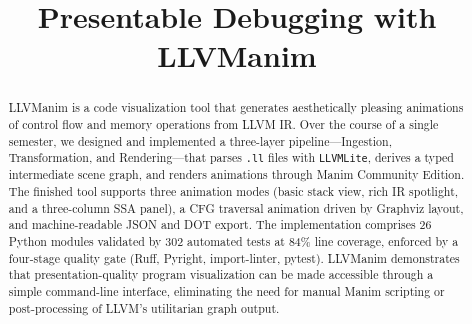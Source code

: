 \documentclass[conference]{IEEEtran}
\begin{document}

\title{Presentable Debugging with LLVManim}
\thispagestyle{plain}
\pagestyle{plain}

\author{
\and
{}
\and
{}
\and
{}
}

\maketitle

\begin{abstract}
LLVManim is a code visualization tool that generates aesthetically pleasing animations of control flow and memory operations from LLVM IR. Over the course of a single semester, we designed and implemented a three-layer pipeline---Ingestion, Transformation, and Rendering---that parses \texttt{.ll} files with \texttt{LLVMLite}, derives a typed intermediate scene graph, and renders animations through Manim Community Edition. The finished tool supports three animation modes (basic stack view, rich IR spotlight, and a three-column SSA panel), a CFG traversal animation driven by Graphviz layout, and machine-readable JSON and DOT export. The implementation comprises 26 Python modules validated by 302 automated tests at 84\% line coverage, enforced by a four-stage quality gate (Ruff, Pyright, import-linter, pytest). LLVManim demonstrates that presentation-quality program visualization can be made accessible through a simple command-line interface, eliminating the need for manual Manim scripting or post-processing of LLVM's utilitarian graph output.
\end{abstract}
\end{document}
